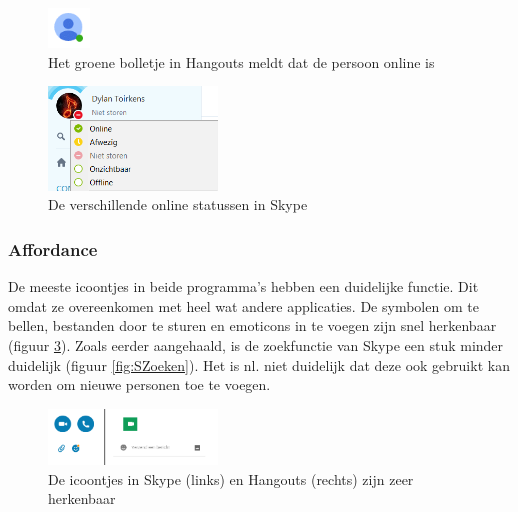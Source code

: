 \documentclass[11pt]{article}
\begin{document}
\begin{figure}
	\centering
	\includegraphics[width=0.1\textwidth]{Dylan_HOnline.png}
	\caption{Het groene bolletje in Hangouts meldt dat de persoon online is}
	\label{fig:HOnline}
\end{figure}
\begin{figure}
	\centering
	\includegraphics[width=0.4\textwidth]{Dylan_SStatus.png}
	\caption{De verschillende online statussen in Skype}
	\label{fig:SStatus}
\end{figure}
\subsubsection{Affordance}
De meeste icoontjes in beide programma's hebben een duidelijke functie. Dit omdat ze overeenkomen met heel wat andere applicaties. De symbolen om te bellen, bestanden door te sturen en emoticons in te voegen zijn snel herkenbaar (figuur \ref{fig:SHIcoontjes}). Zoals eerder aangehaald, is de zoekfunctie van Skype een stuk minder duidelijk (figuur \ref{fig:SZoeken}). Het is nl. niet duidelijk dat deze ook gebruikt kan worden om nieuwe personen toe te voegen. 
\begin{figure}
	\centering
	\includegraphics[width=0.4\textwidth]{Dylan_SHIcoontjes.png}
	\caption{De icoontjes in Skype (links) en Hangouts (rechts) zijn zeer herkenbaar}
	\label{fig:SHIcoontjes}
\end{figure}
\end{document}
